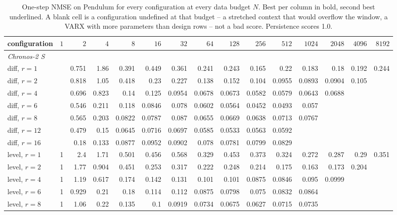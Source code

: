 \begin{table}[t]
\centering\scriptsize
\caption{One-step NMSE on Pendulum for every configuration at every data budget $N$. Best per column in bold, second best underlined. A blank cell is a configuration undefined at that budget -- a stretched context that would overflow the window, a VARX with more parameters than design rows -- not a bad score. Persistence scores 1.0.}
\label{tab:grid-pendulum}
\begin{tabular}{lrrrrrrrrrrrrrr}
\toprule
configuration & $1$ & $2$ & $4$ & $8$ & $16$ & $32$ & $64$ & $128$ & $256$ & $512$ & $1024$ & $2048$ & $4096$ & $8192$ \\
\midrule
\multicolumn{15}{l}{\textit{Chronos-2 S}} \\
\quad diff, $r{=}1$ &  & 0.751 & 1.86 & 0.391 & 0.449 & 0.361 & 0.241 & 0.243 & 0.165 & 0.22 & 0.183 & 0.18 & 0.192 & 0.244 \\
\quad diff, $r{=}2$ &  & 0.818 & 1.05 & 0.418 & 0.23 & 0.227 & 0.138 & 0.152 & 0.104 & 0.0955 & 0.0893 & 0.0904 & 0.105 &  \\
\quad diff, $r{=}4$ &  & 0.696 & 0.823 & 0.14 & 0.125 & 0.0954 & 0.0678 & 0.0673 & 0.0582 & 0.0579 & 0.0643 & 0.0688 &  &  \\
\quad diff, $r{=}6$ &  & 0.546 & 0.211 & 0.118 & 0.0846 & 0.078 & 0.0602 & 0.0564 & 0.0452 & 0.0493 & 0.057 &  &  &  \\
\quad diff, $r{=}8$ &  & 0.565 & 0.203 & 0.0822 & 0.0787 & 0.087 & 0.0655 & 0.0669 & 0.0638 & 0.0713 & 0.0767 &  &  &  \\
\quad diff, $r{=}12$ &  & 0.479 & 0.15 & 0.0645 & 0.0716 & 0.0697 & 0.0585 & 0.0533 & 0.0563 & 0.0592 &  &  &  &  \\
\quad diff, $r{=}16$ &  & 0.18 & 0.133 & 0.0877 & 0.0952 & 0.0902 & 0.078 & 0.0781 & 0.0799 & 0.0829 &  &  &  &  \\
\quad level, $r{=}1$ & 1 & 2.4 & 1.71 & 0.501 & 0.456 & 0.568 & 0.329 & 0.453 & 0.373 & 0.324 & 0.272 & 0.287 & 0.29 & 0.351 \\
\quad level, $r{=}2$ & 1 & 1.77 & 0.904 & 0.451 & 0.253 & 0.317 & 0.222 & 0.248 & 0.214 & 0.175 & 0.163 & 0.173 & 0.204 &  \\
\quad level, $r{=}4$ & 1 & 1.19 & 0.617 & 0.174 & 0.142 & 0.131 & 0.101 & 0.101 & 0.0875 & 0.0846 & 0.095 & 0.0999 &  &  \\
\quad level, $r{=}6$ & 1 & 0.929 & 0.21 & 0.18 & 0.114 & 0.112 & 0.0875 & 0.0798 & 0.075 & 0.0832 & 0.0864 &  &  &  \\
\quad level, $r{=}8$ & 1 & 1.06 & 0.22 & 0.135 & 0.1 & 0.0919 & 0.0734 & 0.0675 & 0.0627 & 0.0715 & 0.0735 &  &  &  \\

\end{tabular}
\end{table}
